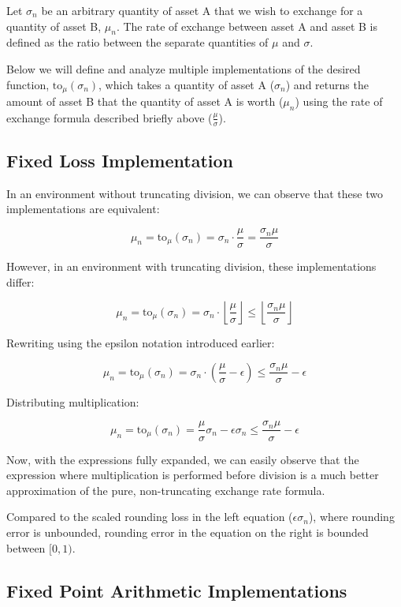 \documentclass{article}
\begin{document}
Let $\sigma_n$ be an arbitrary quantity of asset A that we wish to exchange for a quantity of asset B, $\mu_n$. The rate of exchange between asset A and asset B is defined as the ratio between the separate quantities of $\mu$ and $\sigma$. 

Below we will define and analyze multiple implementations of the desired function, $\mbox{to}_\mu(\sigma_n)$, which takes a quantity of asset A ($\sigma_n$) and returns the amount of asset B that the quantity of asset A is worth ($\mu_n$) using the rate of exchange formula described briefly above ($\frac{\mu}{\sigma}$).

\subsection{Fixed Loss Implementation}

In an environment without truncating division, we can observe that these two implementations are equivalent:

$$ \mu_n = \mbox{to}_\mu(\sigma_n) = \sigma_n \cdot \frac{\mu}{\sigma} = \frac{\sigma_n\mu}{\sigma} $$

However, in an environment with truncating division, these implementations differ:

$$ \mu_n = \mbox{to}_\mu(\sigma_n) = \sigma_n \cdot \left\lfloor\frac{\mu}{\sigma}\right\rfloor \leq \left\lfloor\frac{\sigma_n\mu}{\sigma}\right\rfloor $$

Rewriting using the epsilon notation introduced earlier:

$$ \mu_n = \mbox{to}_\mu(\sigma_n) = \sigma_n \cdot \left(\frac{\mu}{\sigma} - \epsilon\right) \leq \frac{\sigma_n\mu}{\sigma} - \epsilon $$

Distributing multiplication:

$$ \mu_n = \mbox{to}_\mu(\sigma_n) = \frac{\mu}{\sigma}\sigma_n - \epsilon\sigma_n \leq \frac{\sigma_n\mu}{\sigma} - \epsilon $$


Now, with the expressions fully expanded, we can easily observe that the expression where multiplication is performed before division is a much better approximation of the pure, non-truncating exchange rate formula.

Compared to the scaled rounding loss in the left equation ($\epsilon\sigma_n$), where rounding error is unbounded, rounding error in the equation on the right is bounded between $[0, 1)$.

\newpage

\subsection{Fixed Point Arithmetic Implementations}
\end{document}
